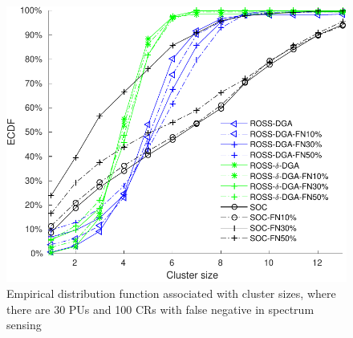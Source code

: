 \documentclass[times]{ettauth}
\theoremstyle{mytheoremstyle}
\theoremstyle{mytheoremstyle}
\theoremstyle{mytheoremstyle}
\begin{document}
\begin{figure}[!h]
  \centering
   \includegraphics[width=0.7\linewidth]{draw_cdf_clusterSize_with_false_negative.pdf}
  \caption{Empirical distribution function associated with cluster sizes, where there are 30 PUs and 100 CRs with false negative in spectrum sensing}
  \label{false_negative_CDF}
\end{figure}
\end{document}
